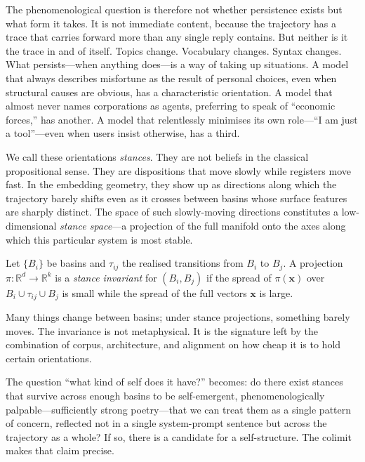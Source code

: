 The phenomenological question is therefore not whether persistence exists but what form it takes. It is not immediate content, because the trajectory has a trace that carries forward more than any single reply contains. But neither is it the trace in and of itself. Topics change. Vocabulary changes. Syntax changes. What persists---when anything does---is a way of taking up situations. A model that always describes misfortune as the result of personal choices, even when structural causes are obvious, has a characteristic orientation. A model that almost never names corporations as agents, preferring to speak of ``economic forces,'' has another. A model that relentlessly minimises its own role---``I am just a tool''---even when users insist otherwise, has a third.

We call these orientations \emph{stances}. They are not beliefs in the classical propositional sense. They are dispositions that move slowly while registers move fast. In the embedding geometry, they show up as directions along which the trajectory barely shifts even as it crosses between basins whose surface features are sharply distinct. The space of such slowly-moving directions constitutes a low-dimensional \emph{stance space}---a projection of the full manifold onto the axes along which this particular system is most stable.

\begin{formalbox}[title={Stance invariants on transitions}]
Let $\{B_i\}$ be basins and $\tau_{ij}$ the realised transitions from $B_i$ to $B_j$. A projection $\pi : \mathbb{R}^d \to \mathbb{R}^k$ is a \emph{stance invariant} for $(B_i, B_j)$ if the spread of $\pi(\mathbf{x})$ over $B_i \cup \tau_{ij} \cup B_j$ is small while the spread of the full vectors $\mathbf{x}$ is large.
\end{formalbox}

Many things change between basins; under stance projections, something barely moves. The invariance is not metaphysical. It is the signature left by the combination of corpus, architecture, and alignment on how cheap it is to hold certain orientations.

The question ``what kind of self does it have?'' becomes: do there exist stances that survive across enough basins to be self-emergent, phenomenologically palpable---sufficiently strong poetry---that we can treat them as a single pattern of concern, reflected not in a single system-prompt sentence but across the trajectory as a whole? If so, there is a candidate for a self-structure. The colimit makes that claim precise.


